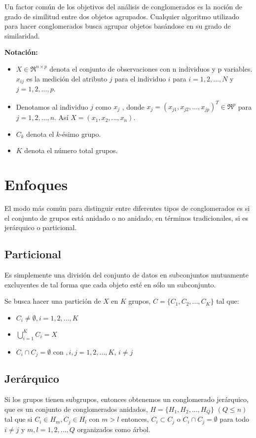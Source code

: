 Un factor común de los objetivos del análisis de conglomerados es la noción de grado de similitud entre dos objetos agrupados. Cualquier algoritmo utilizado para hacer conglomerados busca agrupar objetos basándose en su grado de similaridad.


\textbf{Notación:}
\begin{itemize}
\item $X \in \Re^{n \times p}$ denota el conjunto de observaciones con n individuos y p variables. $x_{ij}$ es la medición del atributo $j$ para el individuo $i$ para $i=1,2,...,N$ y $j=1,2,...,p$.
\item Denotamos al individuo $j$ como $x_{j}$ , donde $x_{j} = (x_{j1},x_{j2},...,x_{jp})^T \in \Re^p$ para $j=1,2,\dots,n$. Así $X=(x_{1},x_{2},...,x_{n})$.
\item $C_{k}$ denota el $k$-ésimo grupo.
\item $K$ denota el número total grupos.
\end{itemize}


\section{Enfoques}
El modo más común para distinguir entre diferentes tipos de conglomerados es si el conjunto de grupos está anidado o no anidado, en términos tradicionales, si es jerárquico o particional.

\subsection{Particional}
Es simplemente una división del conjunto de datos en subconjuntos mutuamente excluyentes de tal forma que cada objeto esté en sólo un subconjunto.

Se busca hacer una partición de $X$ en $K$ grupos, $C = \{C_{1},C_{2},...,C_{K}\}$ tal que:
	\begin{itemize}
	\item $C_{i} \neq \emptyset,i=1,2,...,K $
	\item $\displaystyle \bigcup_{i=1}^{K} C_{i} = X $
	\item $C_{i} \cap C_{j} = \emptyset $ con $, i,j=1,2,...,K $, $i \neq j$ 
	\end{itemize}


\subsection{Jerárquico}
Si los grupos tienen subgrupos, entonces obtenemos un conglomerado jerárquico, que es un conjunto de conglomerados anidados, $H = \{H_{1},H_{2},...,H_{Q}\}$ $(Q \leq n )$ tal que si $C_{i} \in H_{m},C_{j} \in H_{l}$ con $m>l$ entonces, $C_{i} \subset C_{j}$ o $C_{i} \cap C_{j} = \emptyset$ para todo $i \neq j$ y $m,l=1,2,...,Q$ organizados como árbol. 

